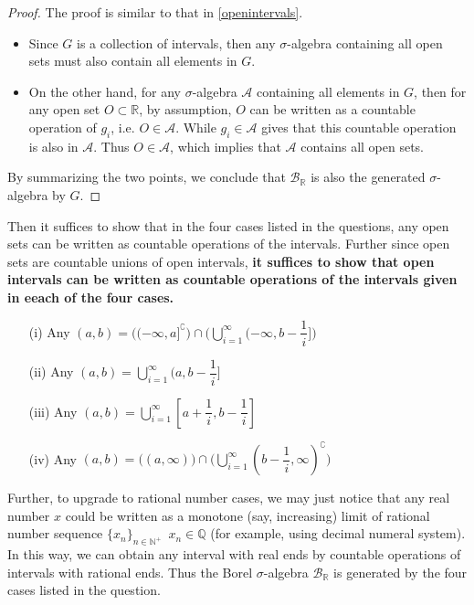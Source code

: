 \documentclass[11pt,a4paper]{article}
\numberwithin{equation}{section}%
\begin{document}
\begin{proof}
    The proof is similar to that in \ref{openintervals}.
    \begin{itemize}[topsep=2pt,itemsep=0pt]
        \item Since $ G $ is a collection of intervals, then any $ \sigma  $-algebra containing all open sets must also contain all elements in $ G $.
        \item On the other hand, for any $ \sigma  $-algebra $ \mathcal{A} $ containing all elements in $ G $, then for any open set $ O\subset \mathbb{R} $, by assumption, $ O $ can be written as a countable operation of $ g_i $, i.e. $ O\in \mathcal{A} $. While $ g_i\in  \mathcal{A} $ gives that this countable operation is also in $ \mathcal{A} $. Thus $ O\in \mathcal{A} $, which implies that $ \mathcal{A} $ contains all open sets.
    \end{itemize}
    By summarizing the two points, we conclude that $ \mathcal{B}_\mathbb{R} $ is also the generated $ \sigma $-algebra by $ G $.
\end{proof}


Then it suffices to show that in the four cases listed in the questions, any open sets can be written as countable operations of the intervals. Further since open sets are countable unions of open intervals, \textbf{it suffices to show that open intervals can be written as countable operations of the intervals given in eeach of the four cases.}

\begin{itemize}[topsep=2pt,itemsep=0pt]
    \item[(i)] Any $ (a,b) = \big( (-\infty ,a]^\complement \big) \cap \big( \bigcup_{i=1}^\infty (-\infty, b-\dfrac{ 1 }{ i } ] \big) $
    \item[(ii)] Any $ (a,b) =  \bigcup_{i=1}^\infty (a, b-\dfrac{ 1 }{ i } ] $
    \item[(iii)] Any $ (a,b) =  \bigcup_{i=1}^\infty [a+\dfrac{ 1 }{ i }, b - \dfrac{ 1 }{ i } ]$
    \item[(iv)] Any $ (a,b) =  \big((a,\infty)\big)\cap \big( \bigcup_{i=1}^\infty (b-\dfrac{ 1 }{ i },\infty )^\complement \big)$
\end{itemize}

Further, to upgrade to rational number cases, we may just notice that any real number $ x $ could be written as a monotone (say, increasing) limit of rational number sequence $ \{x_n\}_{n\in \mathbb{N}^+} $\, $ x_n\in \mathbb{Q} $ (for example, using decimal numeral system). In this way, we can obtain any interval with real ends by countable operations of intervals with rational ends. Thus the Borel $ \sigma $-algebra $ \mathcal{B}_\mathbb{R} $ is generated by the four cases listed in the question.
\end{document}
